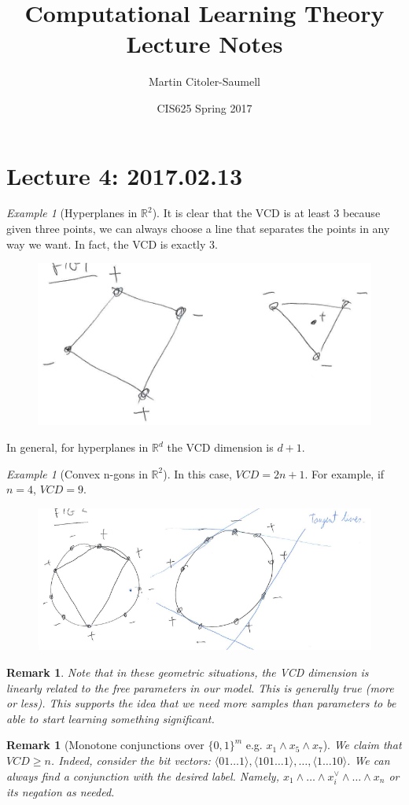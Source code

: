 \documentclass[12pt, letterpaper]{article}
\title{Computational Learning Theory Lecture Notes}
\author{Martin Citoler-Saumell}
\date{CIS625 Spring 2017}
\numberwithin{equation}{section} %
\newcommand{\R}{\mathbb{R}}
\newtheorem{remark}[theorem]{Remark}
\theoremstyle{definition}
\theoremstyle{remark}
\newtheorem{example}[theorem]{Example}
\begin{document}
\section{Lecture 4: 2017.02.13}

\begin{example}[Hyperplanes in $\R^2$]
    It is clear that the VCD is at least 3 because given three points, we can always choose a line that separates the points in any way we want. In fact, the VCD is exactly 3.
    \begin{figure}[H]
    \centering
    \includegraphics[width=0.3\linewidth]{img/hyperplanes.png}
    \end{figure}
    In general, for hyperplanes in $\R^d$ the VCD dimension is $d+1$.
\end{example}

\begin{example}[Convex n-gons in $\R^2$]
    In this case, $VCD = 2n+1$. For example, if $n=4$, $VCD = 9$.
    \begin{figure}[H]
    \centering
    \includegraphics[width=0.3\linewidth]{img/4-gons.png}
    \end{figure}
\end{example}

\begin{remark}
    Note that in these geometric situations, the VCD dimension is linearly related to the free parameters in our model. This is generally true (more or less). This supports the idea that we need more samples than parameters to be able to start learning something significant.
\end{remark}

\begin{remark}[Monotone conjunctions over $\lbrace 0,1 \rbrace^m$ e.g. $x_1\land x_5\land x_7$]
    We claim that $VCD \geq n$. Indeed, consider the bit vectors: $\langle01\ldots 1\rangle, \langle 101\ldots 1\rangle, \ldots, \langle1\ldots 10\rangle$. We can always find a conjunction with the desired label. Namely, $x_1\land\ldots \land x_i^\lor\land\ldots\land x_n$ or its negation as needed.
\end{remark}
\end{document}
